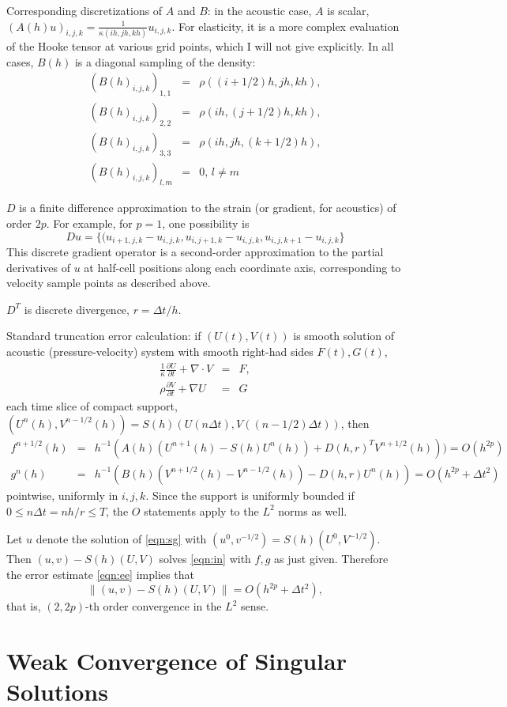 Corresponding discretizations of $A$ and $B$: in the acoustic case, $A$ is scalar,
$(A(h) u)_{i,j,k} = \frac{1}{\kappa(ih,jh,kh)}u_{i,j,k}$. For
elasticity, it is a more complex evaluation of the Hooke tensor at
various grid points, which I will not give explicitly. In all cases,
$B(h)$ is a diagonal sampling of the density: 
\begin{eqnarray*}
(B(h)_{i,j,k})_{1,1} & = & \rho((i+1/2)h,jh,kh),\\
(B(h)_{i,j,k})_{2,2} & = & \rho(ih,(j+1/2)h,kh),\\
(B(h)_{i,j,k})_{3,3} & = & \rho(ih,jh,(k+1/2)h),\\
(B(h)_{i,j,k})_{l,m} & = & 0,\,l \ne m
\end{eqnarray*}

$D$ is a finite difference approximation to the strain (or gradient,
for acoustics) of order $2p$. For example, for $p=1$, one possibility is 
\[
D u =
\{(u_{i+1,j,k}-u_{i,j,k},u_{i,j+1,k}-u_{i,j,k},u_{i,j,k+1}-u_{i,j,k}\}
\]
This discrete gradient operator is a second-order approximation to the
partial derivatives of $u$ at half-cell positions along each
coordinate axis, corresponding to velocity sample points as described
above.

$D^T$ is discrete divergence, $r = \Delta t/h$.

Standard truncation error calculation: if $(U(t), V(t))$ is smooth solution of
acoustic (pressure-velocity) system with smooth right-had sides $F(t),G(t)$, 
\begin{eqnarray}
\label{vdawe.fd}
\frac{1}{\kappa}\frac{\partial U}{\partial t} + \nabla \cdot V & = &
                                                                     F,\\
\rho \frac{\partial V}{\partial t} + \nabla U & = & G
\end{eqnarray}
each time slice of compact
support, $(U^n(h),V^{n-1/2}(h)) = S(h)(U(n\Delta t),V((n-1/2)\Delta t))$, then
\begin{eqnarray}
\label{eqn:tr2}
f^{n+1/2}(h)& =& h^{-1}(A(h)(U^{n+1}(h) - S(h)U^n(h)) + D(h,r)^T
                 V^{n+1/2}(h))) = O(h^{2p})\\
g^{n}(h)& =& h^{-1}(B(h)(V^{n+1/2}(h)-V^{n-1/2}(h)) - D(h,r)
             U^n(h)) = O(h^{2p}+\Delta t^2)
\end{eqnarray}
pointwise, uniformly in $i,j,k$. Since the support is uniformly bounded if
$0\le n\Delta t = nh/r \le T$, the $O$ statements apply  to the $L^2$
norms as well.

Let $u$ denote the solution of \ref{eqn:sg} with
$(u^0,v^{-1/2})=S(h)(U^0,V^{-1/2})$. Then $(u,v)-S(h)(U,V)$ solves
\ref{eqn:in} with $f,g$ as just given.  Therefore the error estimate
\ref{eqn:ee} implies that 
\[
\|(u,v)-S(h)(U,V)\| = O(h^{2p} + \Delta t^2),
\]
that is, $(2,2p)$-th order convergence in the $L^2$ sense.

\section{Weak Convergence of Singular Solutions}
